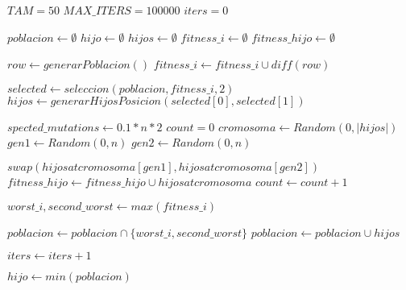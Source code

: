 \begin{algorithm}[H]
  \begin{algorithmic}[1]
      \State $TAM = 50$
      \State $MAX\_ITERS = 100000$
      \State $iters = 0$

      \State $poblacion \gets \emptyset$ 
      \State $hijo \gets \emptyset$ 
      \State $hijos \gets \emptyset$
      \State $fitness\_i \gets \emptyset$
      \State $fitness\_hijo \gets \emptyset$
      
        \State $row \gets generarPoblacion()$
        \State $fitness\_i \gets fitness\_i \cup diff(row)$
      \EndFor

        
        \State $selected \gets seleccion(poblacion,fitness\_i,2)$
        \State $hijos \gets generarHijosPosicion(selected[0],selected[1])$
        
        \State $spected\_mutations \gets 0.1*n*2$
        \State $count = 0$
          \State $cromosoma \gets Random(0,|hijos|)$ 
          \State $gen1 \gets Random(0,n)$
          \State $gen2 \gets Random(0,n)$ 

           
            \State $swap(hijos at cromosoma[gen1], hijos at cromosoma[gen2])$ 
            \State $fitness\_hijo \gets fitness\_hijo \cup hijos at cromosoma$ 
          \EndIf
          \State $count \gets count +1 $
        \EndWhile

        \State $worst\_i,second\_worst \gets max(fitness\_i)$ 
       
        \State $poblacion \gets poblacion \cap \{worst\_i,second\_worst\}$
        \State $poblacion \gets poblacion \cup {hijos}$ 
        
        \State $iters \gets iters + 1 $
      \EndWhile
      
      \State $hijo \gets min(poblacion)$
      \State {}
    \EndFunction
  \end{algorithmic}
\end{algorithm}
\newpage
